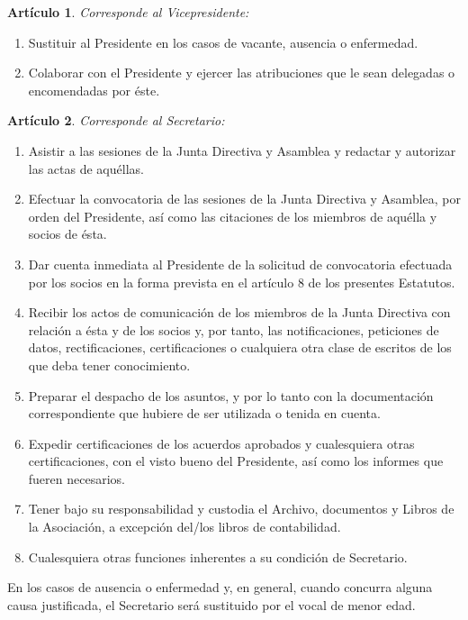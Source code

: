\documentclass[a4paper,12pt]{article}
\theoremstyle{mystyle}		%
\newtheorem{art}{Artículo}	%
\begin{document}
\begin{onehalfspace}
\begin{art}
Corresponde al Vicepresidente:
\end{art}
\begin{enumerate}[label={\alph*)}]
 \item Sustituir al Presidente en los casos de vacante, ausencia o enfermedad.
 \item Colaborar con el Presidente y ejercer las atribuciones que le sean delegadas o encomendadas por éste.
\end{enumerate}

\begin{art}
Corresponde al Secretario:
\end{art}
\begin{enumerate}[label={\alph*)}]
 \item Asistir a las sesiones de la Junta Directiva y Asamblea y redactar y autorizar las actas de aquéllas.
 \item Efectuar la convocatoria de las sesiones de la Junta Directiva y Asamblea, por orden del Presidente, así como las citaciones de los miembros de aquélla y socios de ésta.
 \item Dar cuenta inmediata al Presidente de la solicitud de convocatoria efectuada por los socios en la forma prevista en el artículo 8 de los presentes Estatutos.
 \item Recibir los actos de comunicación de los miembros de la Junta Directiva con relación a ésta y de los socios y, por tanto, las notificaciones, peticiones de datos, rectificaciones, certificaciones o cualquiera otra clase de escritos de los que deba tener conocimiento.
 \item Preparar el despacho de los asuntos, y por lo tanto con la documentación correspondiente que hubiere de ser utilizada o tenida en cuenta.
 \item Expedir certificaciones de los acuerdos aprobados y cualesquiera otras certificaciones, con el visto bueno del Presidente, así como los informes que fueren necesarios.
 \item Tener bajo su responsabilidad y custodia el Archivo, documentos y Libros de la Asociación, a excepción del/los libros de contabilidad.
 \item Cualesquiera otras funciones inherentes a su condición de Secretario.
\end{enumerate}

En los casos de ausencia o enfermedad y, en general, cuando concurra alguna causa justificada, el Secretario será sustituido por el vocal de menor edad.


\end{onehalfspace}
\end{document}
